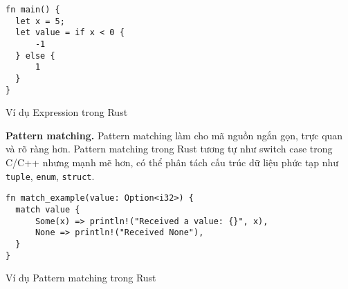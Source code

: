 \begin{listing}[H]
\begin{verbatim}
fn main() {
  let x = 5;
  let value = if x < 0 {
      -1
  } else {
      1
  }
}
\end{verbatim}
\caption{Ví dụ Expression trong Rust}
\label{code:fp_expression}
\end{listing}

\textbf{Pattern matching.}
Pattern matching làm cho mã nguồn ngắn gọn, trực quan và rõ ràng hơn. Pattern matching trong Rust tương tự như switch case trong C/C++ nhưng mạnh mẽ hơn, có thể phân tách cấu trúc dữ liệu phức tạp như \texttt{tuple}, \texttt{enum}, \texttt{struct}.

\begin{listing}[H]
\begin{verbatim}
fn match_example(value: Option<i32>) {
  match value {
      Some(x) => println!("Received a value: {}", x),
      None => println!("Received None"),
  }
}
\end{verbatim}
\caption{Ví dụ Pattern matching trong Rust}
\label{code:fp_patternmatching}
\end{listing}





